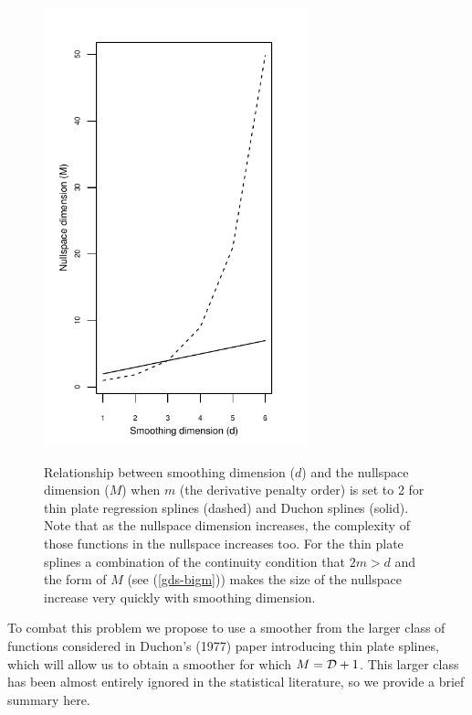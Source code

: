 \documentclass[useAMS, referee]{biom}
\begin{document}
\begin{figure}
\centering
\includegraphics[width=3in]{figs/nullspace-dim.pdf} \\
\caption{Relationship between smoothing dimension ($d$) and the nullspace dimension ($M$) when $m$ (the derivative penalty order) is set to 2 for thin plate regression splines (dashed) and Duchon splines (solid). Note that as the nullspace dimension increases, the complexity of those functions in the nullspace increases too. For the thin plate splines a combination of the continuity condition that $2m>d$ and the form of $M$ (see (\ref{gds-bigm})) makes the size of the nullspace increase very quickly with smoothing dimension.}
\label{nullspace-dim}
\end{figure}


To combat this problem we propose to use a smoother from the larger class of functions considered in Duchon's (1977) paper introducing thin plate splines, which will allow us to obtain a smoother for which $M = {\cal D} + 1$. This larger class has been almost entirely ignored in the statistical literature, so we provide a brief summary here. 
\end{document}

